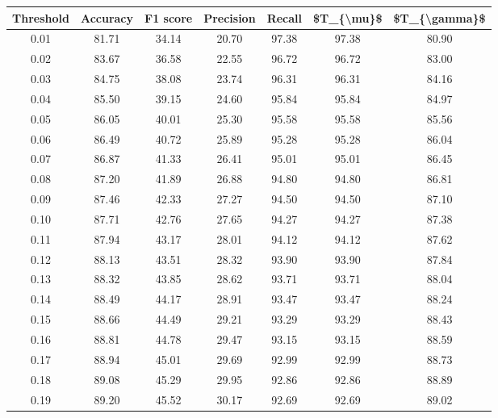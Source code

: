 \begin{tabular}{|c|c|c|c|c|c|c|}
\hline
 Threshold &  Accuracy &  F1 score &  Precision &  Recall &  \$T\_\{\textbackslash mu\}\$ &  \$T\_\{\textbackslash gamma\}\$ \\
\hline
      0.01 &     81.71 &     34.14 &      20.70 &   97.38 &      97.38 &         80.90 \\
      0.02 &     83.67 &     36.58 &      22.55 &   96.72 &      96.72 &         83.00 \\
      0.03 &     84.75 &     38.08 &      23.74 &   96.31 &      96.31 &         84.16 \\
      0.04 &     85.50 &     39.15 &      24.60 &   95.84 &      95.84 &         84.97 \\
      0.05 &     86.05 &     40.01 &      25.30 &   95.58 &      95.58 &         85.56 \\
      0.06 &     86.49 &     40.72 &      25.89 &   95.28 &      95.28 &         86.04 \\
      0.07 &     86.87 &     41.33 &      26.41 &   95.01 &      95.01 &         86.45 \\
      0.08 &     87.20 &     41.89 &      26.88 &   94.80 &      94.80 &         86.81 \\
      0.09 &     87.46 &     42.33 &      27.27 &   94.50 &      94.50 &         87.10 \\
      0.10 &     87.71 &     42.76 &      27.65 &   94.27 &      94.27 &         87.38 \\
      0.11 &     87.94 &     43.17 &      28.01 &   94.12 &      94.12 &         87.62 \\
      0.12 &     88.13 &     43.51 &      28.32 &   93.90 &      93.90 &         87.84 \\
      0.13 &     88.32 &     43.85 &      28.62 &   93.71 &      93.71 &         88.04 \\
      0.14 &     88.49 &     44.17 &      28.91 &   93.47 &      93.47 &         88.24 \\
      0.15 &     88.66 &     44.49 &      29.21 &   93.29 &      93.29 &         88.43 \\
      0.16 &     88.81 &     44.78 &      29.47 &   93.15 &      93.15 &         88.59 \\
      0.17 &     88.94 &     45.01 &      29.69 &   92.99 &      92.99 &         88.73 \\
      0.18 &     89.08 &     45.29 &      29.95 &   92.86 &      92.86 &         88.89 \\
      0.19 &     89.20 &     45.52 &      30.17 &   92.69 &      92.69 &         89.02 \\

\end{tabular}
